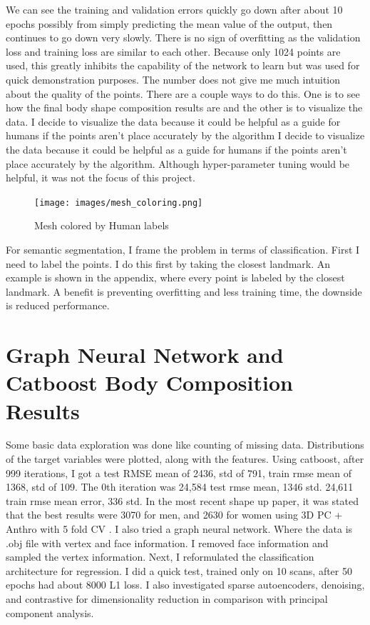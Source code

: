 We can see the training and validation errors quickly go down after about 10 epochs possibly from simply predicting the mean value of the output, then continues to go down very slowly. There is no sign of overfitting as the validation loss and training loss are similar to each other. Because only 1024 points are used, this greatly inhibits the capability of the network to learn but was used for quick demonstration purposes. The number does not give me much intuition about the quality of the points. There are a couple ways to do this. One is to see how the final body shape composition results are and the other is to visualize the data. I decide to visualize the data because it could be helpful as a guide for humans if the points aren't place accurately by the algorithm  I decide to visualize the data because it could be helpful as a guide for humans if the points aren't place accurately by the algorithm. Although hyper-parameter tuning would be helpful, it was not the focus of this project. 

\begin{figure}[!htb]
	\caption{Mesh colored by Human labels}
	\centering
	\texttt{[image: images/mesh\_coloring.png]}
\end{figure}

For semantic segmentation, I frame the problem in terms of classification. First I need to label the points. I do this first by taking the closest landmark. An example is shown in the appendix, where every point is labeled by the closest landmark. A benefit is preventing overfitting and less training time, the downside is reduced performance.

\section{Graph Neural Network and Catboost Body Composition Results}

Some basic data exploration was done like counting of missing data. Distributions of the target variables were plotted, along with the features. Using catboost, after 999 iterations, I got a test RMSE mean of 2436, std of 791, train rmse mean of 1368, std of 109. The 0th iteration was 24,584 test rmse mean, 1346 std. 24,611 train rmse mean error, 336 std. In the most recent shape up paper, it was stated that the best results were 3070 for men, and 2630 for women using 3D PC + Anthro with 5 fold CV \cite{article}. I also tried a graph neural network. Where the data is .obj file with vertex and face information. I removed face information and sampled the vertex information. Next, I reformulated the classification architecture for regression. I did a quick test, trained only on 10 scans, after 50 epochs had about 8000 L1 loss. I also investigated sparse autoencoders, denoising, and contrastive for dimensionality reduction in comparison with principal component analysis.

